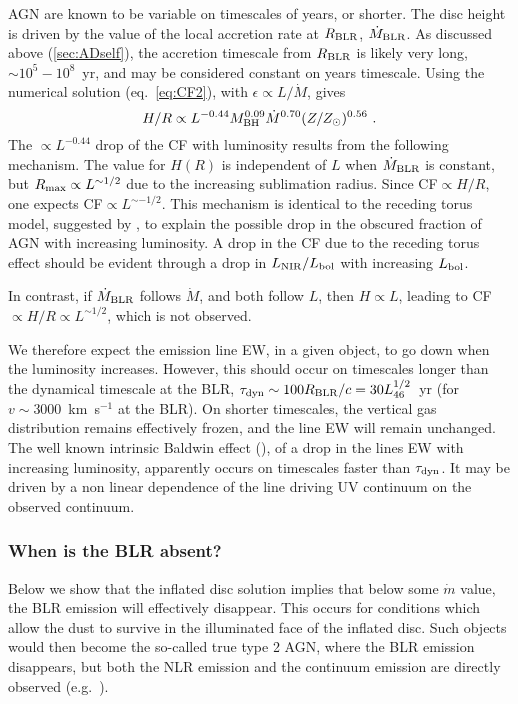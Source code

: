 \documentclass[a4paper,fleqn,usenatbib]{mnras}
\newcommand{\mdot}{\dot{M}}
\begin{document}
AGN are known to be variable on timescales of years, or shorter. The disc height is driven by
the value of the local accretion rate at $R_{\rm BLR}$, $\mdot_{\rm BLR}$. As discussed above (\ref{sec:ADself}), the
accretion timescale from $R_{\rm BLR}$ is likely very long, $\sim 10^5-10^8$~yr, and may
be considered constant on years timescale. Using the numerical solution (eq.~\ref{eq:CF2}), 
with $\epsilon\propto L/\mdot$, gives
\begin{equation} 
H/R\propto L^{-0.44}M_{\rm BH}^{0.09}\mdot^{0.70}(Z/Z_{\odot})^{0.56}\ .  
\label{eq:cf_num}  
\end{equation} 
The $\propto L^{-0.44}$ drop of the CF with luminosity results from the following mechanism.
The value for $H(R)$ is independent of $L$ when $\mdot_{\rm BLR}$ is constant, 
but $R_{\rm max}\propto L^{\sim 1/2}$ due to the increasing sublimation radius.
Since CF$\propto H/R$, one expects CF$\propto L^{\sim -1/2}$. 
This mechanism is identical to the receding torus model, suggested by \citet{Lawrence91},
to explain the possible drop in the obscured fraction of AGN with increasing luminosity. 
A drop in the CF due to the receding torus effect should be evident through a drop in 
$L_{\rm NIR}/L_{\rm bol}$ with increasing $L_{\rm bol}$.

In contrast, if $\mdot_{\rm BLR}$ follows $\mdot$, and both follow $L$, then $H\propto L$,
leading to CF$\propto H/R\propto L^{\sim 1/2}$, which is not observed.

We therefore expect the emission line EW, in a given object, to go down when the luminosity increases. 
However, this should occur on timescales longer than the dynamical timescale at the 
BLR, $\tau_{\rm dyn}\sim 100R_{\rm BLR}/c=30 L_{46}^{1/2}$~yr (for 
$v\sim 3000$~km~s$^{-1}$ at the BLR). On shorter timescales, the vertical gas distribution 
remains effectively frozen, and the line EW will remain unchanged.
The well known intrinsic Baldwin effect (\citealt{Pogge92, Wilhite06}), of a drop in the lines EW
with increasing luminosity, apparently occurs on timescales faster than $\tau_{\rm dyn}$. 
It may be driven by a non linear 
dependence of the line driving UV continuum on the observed continuum.  


\subsubsection{When is the BLR absent?} \label{sec:sub_CF:sub:when_BLR_absent}

Below we show that the inflated disc solution implies that below some $\dot{m}$ value, the
BLR emission will effectively disappear.
This occurs for conditions which allow the dust to survive in the illuminated face of the inflated disc.
Such objects would then become the so-called true type 2 AGN, where the BLR emission disappears,
but both the NLR emission and the continuum emission are directly observed (e.g.\ \citealt{Tran01, Bianchi12}).
\end{document}
